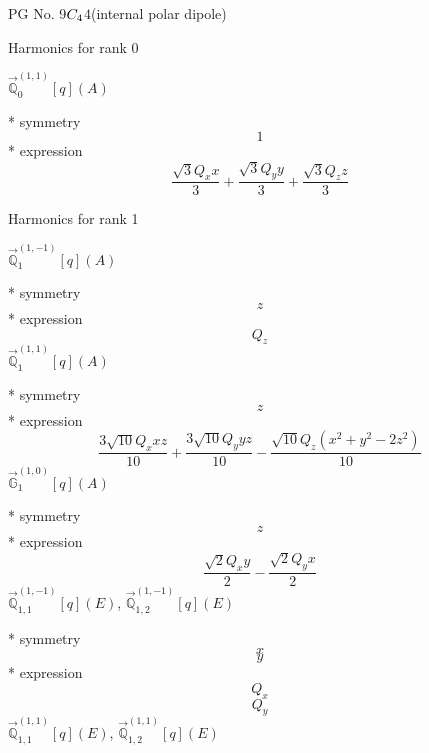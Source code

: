 \documentclass[fleqn,8pt]{jsarticle}
\begin{document}
\setcounter{MaxMatrixCols}{32}

\renewcommand{\tablename}{Table~}
\renewcommand{\figurename}{Figure~}
\begin{center}
\LARGE
PG No. 9\quad$C_{\rm 4}$\quad$4$\quad[ tetragonal ] (internal polar dipole)
\end{center}

\noindent * Harmonics for rank 0

\noindent\quad $\vec{\mathbb{Q}}_{0}^{(1,1)}[q](A)$

\noindent\quad ** symmetry
\begin{dmath*}
1
\end{dmath*}
\noindent\quad ** expression
\begin{dmath*}
\frac{\sqrt{3} Q_{x} x}{3} + \frac{\sqrt{3} Q_{y} y}{3} + \frac{\sqrt{3} Q_{z} z}{3}
\end{dmath*}

\noindent * Harmonics for rank 1

\noindent\quad $\vec{\mathbb{Q}}_{1}^{(1,-1)}[q](A)$

\noindent\quad ** symmetry
\begin{dmath*}
z
\end{dmath*}
\noindent\quad ** expression
\begin{dmath*}
Q_{z}
\end{dmath*}
\noindent\quad $\vec{\mathbb{Q}}_{1}^{(1,1)}[q](A)$

\noindent\quad ** symmetry
\begin{dmath*}
z
\end{dmath*}
\noindent\quad ** expression
\begin{dmath*}
\frac{3 \sqrt{10} Q_{x} x z}{10} + \frac{3 \sqrt{10} Q_{y} y z}{10} - \frac{\sqrt{10} Q_{z} \left(x^{2} + y^{2} - 2 z^{2}\right)}{10}
\end{dmath*}
\noindent\quad $\vec{\mathbb{G}}_{1}^{(1,0)}[q](A)$

\noindent\quad ** symmetry
\begin{dmath*}
z
\end{dmath*}
\noindent\quad ** expression
\begin{dmath*}
\frac{\sqrt{2} Q_{x} y}{2} - \frac{\sqrt{2} Q_{y} x}{2}
\end{dmath*}
\noindent\quad $\vec{\mathbb{Q}}_{1,1}^{(1,-1)}[q](E)$, $\vec{\mathbb{Q}}_{1,2}^{(1,-1)}[q](E)$

\noindent\quad ** symmetry
\begin{dmath*}
x
\end{dmath*}
\begin{dmath*}
y
\end{dmath*}
\noindent\quad ** expression
\begin{dmath*}
Q_{x}
\end{dmath*}
\begin{dmath*}
Q_{y}
\end{dmath*}
\noindent\quad $\vec{\mathbb{Q}}_{1,1}^{(1,1)}[q](E)$, $\vec{\mathbb{Q}}_{1,2}^{(1,1)}[q](E)$
\end{document}
